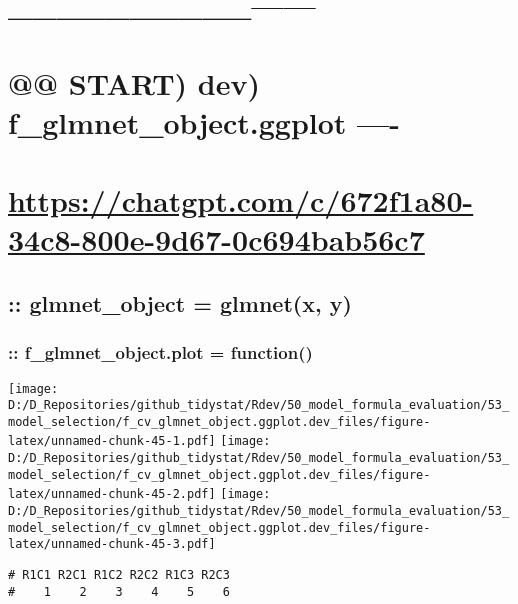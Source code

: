 \documentclass[
]{article}
\begin{document}
\hypertarget{section-2}{%
\section{\_\_\_\_\_\_\_\_\_\_\textbar------}\label{section-2}}

\hypertarget{start-dev-f_glmnet_object.ggplot--}{%
\section{@@ START) dev) f\_glmnet\_object.ggplot
----}\label{start-dev-f_glmnet_object.ggplot--}}

\hypertarget{httpschatgpt.comc672f1a80-34c8-800e-9d67-0c694bab56c7}{%
\section{\texorpdfstring{\url{https://chatgpt.com/c/672f1a80-34c8-800e-9d67-0c694bab56c7}}{https://chatgpt.com/c/672f1a80-34c8-800e-9d67-0c694bab56c7}}\label{httpschatgpt.comc672f1a80-34c8-800e-9d67-0c694bab56c7}}

\hypertarget{glmnet_object-glmnetx-y}{%
\subsection{:: glmnet\_object = glmnet(x,
y)}\label{glmnet_object-glmnetx-y}}

\hypertarget{f_glmnet_object.plot-function}{%
\subsubsection{:: f\_glmnet\_object.plot =
function()}\label{f_glmnet_object.plot-function}}

\texttt{[image: D:/D\_Repositories/github\_tidystat/Rdev/50\_model\_formula\_evaluation/53\_model\_selection/f\_cv\_glmnet\_object.ggplot.dev\_files/figure-latex/unnamed-chunk-45-1.pdf]}
\texttt{[image: D:/D\_Repositories/github\_tidystat/Rdev/50\_model\_formula\_evaluation/53\_model\_selection/f\_cv\_glmnet\_object.ggplot.dev\_files/figure-latex/unnamed-chunk-45-2.pdf]}
\texttt{[image: D:/D\_Repositories/github\_tidystat/Rdev/50\_model\_formula\_evaluation/53\_model\_selection/f\_cv\_glmnet\_object.ggplot.dev\_files/figure-latex/unnamed-chunk-45-3.pdf]}

\begin{verbatim}
# R1C1 R2C1 R1C2 R2C2 R1C3 R2C3 
#    1    2    3    4    5    6
\end{verbatim}
\end{document}

